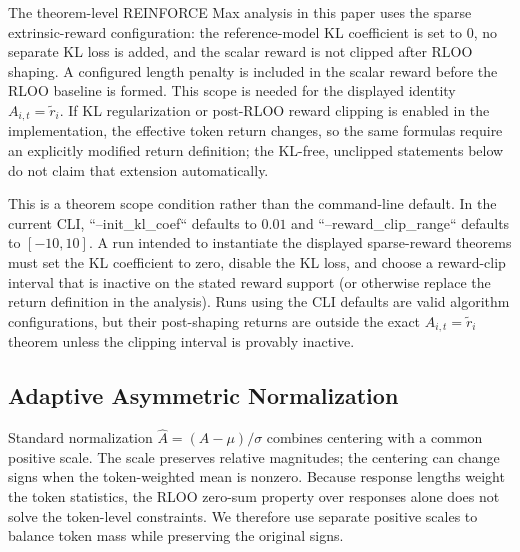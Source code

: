 The theorem-level REINFORCE Max analysis in this paper uses the sparse
extrinsic-reward configuration: the reference-model KL coefficient is set to
$0$, no separate KL loss is added, and the scalar reward is not clipped after
RLOO shaping. A configured length penalty is included in the scalar reward
before the RLOO baseline is formed. This scope is needed for the displayed
identity $A_{i,t}=\tilde r_i$. If KL regularization or post-RLOO reward clipping
is enabled in the implementation, the effective token return changes, so the
same formulas require an explicitly modified return definition; the KL-free,
unclipped statements below do not claim that extension automatically.

This is a theorem scope condition rather than the command-line default. In the
current CLI, ``--init\_kl\_coef`` defaults to $0.01$ and
``--reward\_clip\_range`` defaults to $[-10,10]$. A run intended to instantiate
the displayed sparse-reward theorems must set the KL coefficient to zero, disable
the KL loss, and choose a reward-clip interval that is inactive on the stated
reward support (or otherwise replace the return definition in the analysis).
Runs using the CLI defaults are valid algorithm configurations, but their
post-shaping returns are outside the exact $A_{i,t}=\tilde r_i$ theorem unless
the clipping interval is provably inactive.

\subsection{Adaptive Asymmetric Normalization}
\label{sec:adaptive-norm}

Standard normalization $\hat{A}=(A-\mu)/\sigma$ combines centering with a common positive scale. The scale preserves relative
magnitudes; the centering can change signs when the token-weighted mean is nonzero. Because response lengths weight the token
statistics, the RLOO zero-sum property over responses alone does not solve the token-level constraints. We therefore use separate
positive scales to balance token mass while preserving the original signs.

